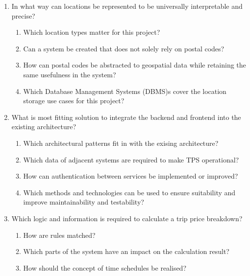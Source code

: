 \begin{enumerate}

	\item In what way can locations be represented to be universally interpretable and precise?
	      \begin{enumerate}[label*=\arabic*.]
					\item Which location types matter for this project?
		      \item Can a system be created that does not solely rely on postal codes?
		      \item How can postal codes be abstracted to geospatial data while retaining the same usefulness in the system?
		      \item Which Database Management Systems (DBMS)s cover the location storage use cases for this project?
	      \end{enumerate}

	\item What is most fitting solution to integrate the backend and frontend into the existing architecture?
	      \begin{enumerate}[label*=\arabic*.]
		      \item Which architectural patterns fit in with the exising architecture?
		      \item Which data of adjacent systems are required to make TPS operational?
		      \item How can authentication between services be implemented or improved?
		      \item Which methods and technologies can be used to ensure suitability and improve maintainability and testability?
	      \end{enumerate}

	\item Which logic and information is required to calculate a trip price breakdown?
	      \begin{enumerate}[label*=\arabic*.]
		      \item How are rules matched?
		      \item Which parts of the system have an impact on the calculation result?
		      \item How should the concept of time schedules be realised?
	      \end{enumerate}


\end{enumerate}
